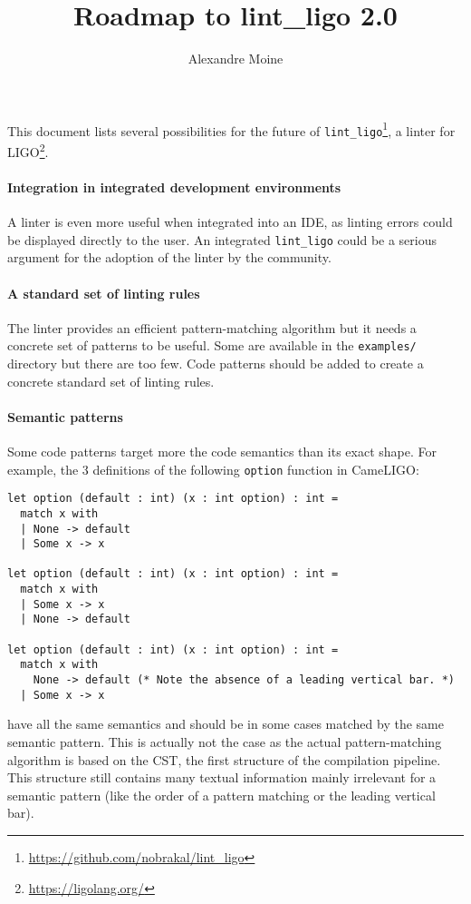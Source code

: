 \documentclass[10pt,a4paper]{article}
\author{Alexandre Moine}
\title{Roadmap to lint\_ligo 2.0}
\begin{document}
\maketitle

This document lists several possibilities for the future of \verb|lint_ligo|\footnote{\url{https://github.com/nobrakal/lint_ligo}}, a linter for LIGO\footnote{\url{https://ligolang.org/}}.

\paragraph{Integration in integrated development environments}
A linter is even more useful when integrated into an IDE, as linting errors could be displayed directly to the user.
An integrated \verb|lint_ligo| could be a serious argument for the adoption of the linter by the community.

\paragraph{A standard set of linting rules}

The linter provides an efficient pattern-matching algorithm but it needs a concrete set of patterns to be useful. Some are available in the \verb|examples/| directory but there are too few. Code patterns should be added to create a concrete standard set of linting rules.

\paragraph{Semantic patterns}
Some code patterns target more the code semantics than its exact shape. For example, the 3 definitions of the following \verb|option| function in CameLIGO:
\begin{verbatim}
let option (default : int) (x : int option) : int =
  match x with
  | None -> default
  | Some x -> x

let option (default : int) (x : int option) : int =
  match x with
  | Some x -> x
  | None -> default

let option (default : int) (x : int option) : int =
  match x with
    None -> default (* Note the absence of a leading vertical bar. *)
  | Some x -> x
\end{verbatim}

have all the same semantics and should be in some cases matched by the same semantic pattern.
This is actually not the case as the actual pattern-matching algorithm is based on the CST, the first structure of the compilation pipeline. This structure still contains many textual information mainly irrelevant for a semantic pattern (like the order of a pattern matching or the leading vertical bar).
\end{document}
